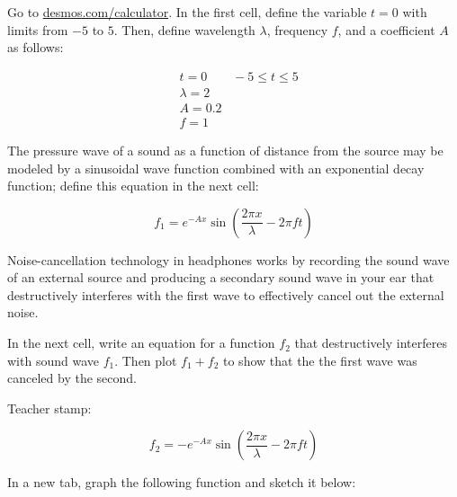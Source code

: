 \documentclass[]{exam}
\begin{document}
\begin{questions}


\question
Go to \href{https://www.desmos.com/calculator}{desmos.com/calculator}. In the first cell, define the variable $t = 0$ with limits from $-5$ to $5$. Then, define wavelength $\lambda$, frequency $f$, and a coefficient $A$ as follows:

\begin{align*}
    & t = 0 \qquad -5 \leq t \leq 5 \\[1ex]
    & \lambda = 2 \\[1ex]
    & A = 0.2 \\[1ex]
    & f = 1
\end{align*}

The pressure wave of a sound as a function of distance from the source may be modeled by a sinusoidal wave function combined with an exponential decay function; define this equation in the next cell:

\begin{equation*}
    f_1 = e^{-Ax} \sin\left(\frac{2\pi x}{\lambda} - 2\pi f t\right)
\end{equation*}

Noise-cancellation technology in headphones works by recording the sound wave of an external source and producing a secondary sound wave in your ear that destructively interferes with the first wave to effectively cancel out the external noise.

In the next cell, write an equation for a function $f_2$ that destructively interferes with sound wave $f_1$. Then plot $f_1 + f_2$ to show that the the first wave was canceled by the second.

\medskip

Teacher stamp: \fillin[]

\begin{solution}
\begin{equation*}
    f_2 = -e^{-Ax} \sin\left(\frac{2\pi x}{\lambda} - 2\pi f t\right)
\end{equation*}    
\end{solution}

\question
In a new tab, graph the following function and sketch it below:


\end{questions}
\end{document}
